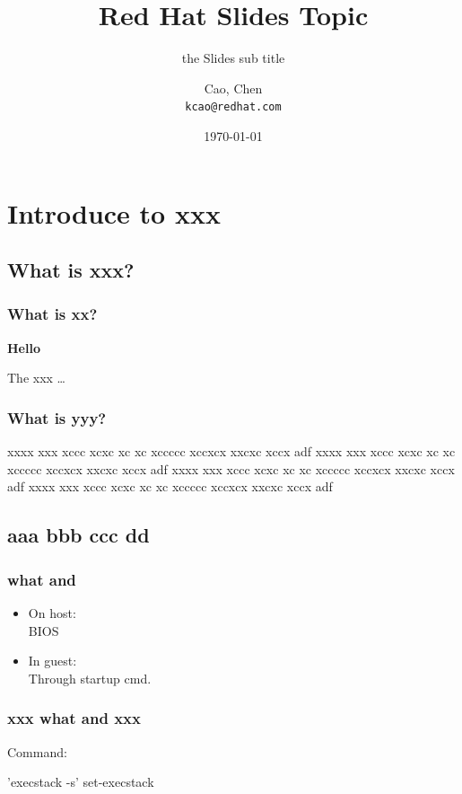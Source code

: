 \documentclass{beamer}
\title{Red Hat Slides Topic}
\subtitle{the Slides sub title}
\author[kcao]{Cao, Chen \\ \texttt{kcao@redhat.com}}
\institute{Red Hat}
\date{\today}
\begin{document}
{

  \frame{
    \titlepage
  }
}

\section[Outline]{}

\section{Introduce to xxx}
\subsection{What is xxx?}
\frame
{
  \frametitle{What is xx?}

\textbf{Hello}

The xxx \dots

}

\frame
{
  \frametitle{What is yyy?}

  xxxx xxx xccc xcxc xc xc xccccc xccxcx  xxcxc  xccx adf
  xxxx xxx xccc xcxc xc xc xccccc xccxcx  xxcxc  xccx adf
\bigskip
  xxxx xxx xccc xcxc xc xc xccccc xccxcx  xxcxc  xccx adf
  xxxx xxx xccc xcxc xc xc xccccc xccxcx  xxcxc  xccx adf

}


\subsection{aaa bbb ccc dd}
\frame
{
  \frametitle{what and }
  \begin{itemize}
  \item On host: \\
  BIOS

  \item In guest: \\
  Through startup cmd.
  \end{itemize}
}
\frame
{
  \frametitle{xxx what and xxx}
  Command:

  'execstack -s' set-execstack
}
\end{document}
